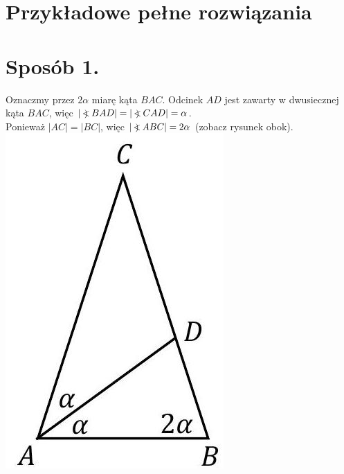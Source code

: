 \documentclass[10pt]{article}
\newcommand\Varangle{\mathop{{<\!\!\!\!\!\text{\small)}}\:}\nolimits}
\begin{document}
\section*{Przykładowe pełne rozwiązania}
\section*{Sposób 1.}
Oznaczmy przez $2 \alpha$ miarę kąta $B A C$. Odcinek $A D$ jest zawarty w dwusiecznej kąta $B A C$, więc $|\Varangle B A D|=|\Varangle C A D|=\alpha$.\\
Ponieważ $|A C|=|B C|$, więc $|\Varangle A B C|=2 \alpha$ (zobacz rysunek obok).\\
\includegraphics[max width=\textwidth, center]{2025_02_07_191ba7668814b12476d0g-21}
\end{document}
